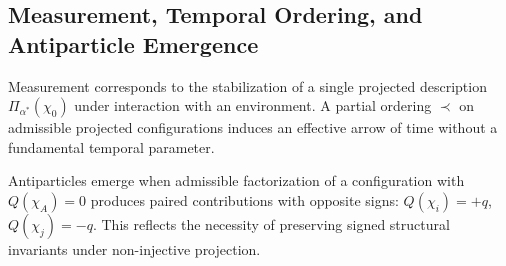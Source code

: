 \subsection{Measurement, Temporal Ordering, and Antiparticle Emergence}
\label{subsec:measurement-temporal-ordering-and-antiparticle-emergence}

Measurement corresponds to the stabilization of a single projected
description $\Pi_{\alpha^*}(\chi_0)$ under interaction with an
environment.
A partial ordering $\prec$ on admissible projected configurations
induces an effective arrow of time without a fundamental temporal
parameter.

Antiparticles emerge when admissible factorization of a configuration
with $Q(\chi_A) = 0$ produces paired contributions with opposite
signs:
$Q(\chi_i) = +q$, $Q(\chi_j) = -q$.
This reflects the necessity of preserving signed structural invariants
under non-injective projection.
